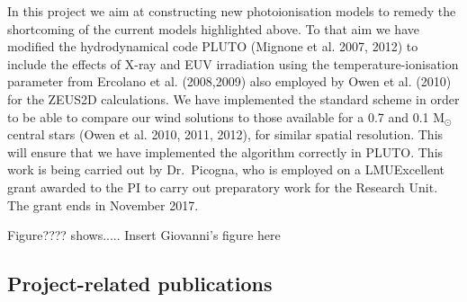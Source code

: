 \documentclass[10pt,fleqn,twoside]{article}
\begin{document}
In this project we aim at constructing new photoionisation models to
remedy the shortcoming of the current models highlighted above. To
that aim we have modified the hydrodynamical code PLUTO (Mignone et
al. 2007, 2012) to include the
effects of X-ray and EUV irradiation using the temperature-ionisation
parameter from Ercolano et al. (2008,2009) also employed by Owen et
al. (2010) for the ZEUS2D calculations. We have implemented the
standard scheme in order to be able to compare our wind solutions to 
those available for a 0.7 and 0.1 M$_\odot$ central
stars (Owen et al. 2010, 2011, 2012), for similar spatial
resolution. This will ensure that we have implemented the algorithm
correctly in PLUTO.  This work is being carried out by Dr.\ Picogna, who
is employed on a LMUExcellent grant awarded to the PI to carry out
preparatory work for the Research Unit. The grant ends in November
2017. 

Figure???? shows..... {\color{red} Insert Giovanni's figure here}


\subsection{Project-related publications}


\end{document}
